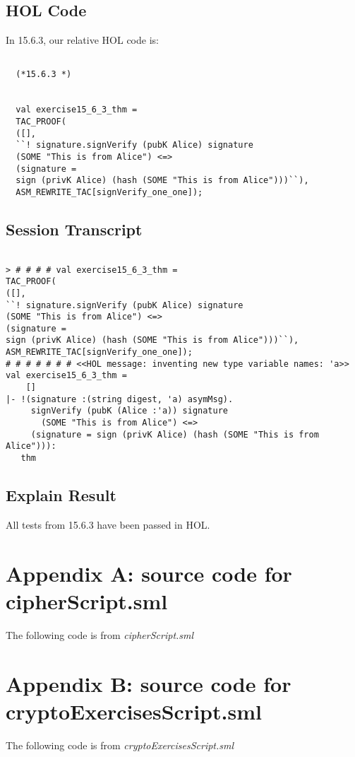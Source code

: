 \documentclass{report}
\begin{document}
\section{HOL Code}
\label{HOl Code 1563}
In 15.6.3, our relative HOL code is:
\begin{lstlisting}[frame=trBL]

  (*15.6.3 *)


  val exercise15_6_3_thm =
  TAC_PROOF(
  ([],
  ``! signature.signVerify (pubK Alice) signature
  (SOME "This is from Alice") <=>
  (signature =
  sign (privK Alice) (hash (SOME "This is from Alice")))``),
  ASM_REWRITE_TAC[signVerify_one_one]);
\end{lstlisting}

\section{Session Transcript}
\label{Session Trans 1563}
\setcounter{sessioncount}{0}
\begin{session}


  \begin{scriptsize}
\begin{verbatim}

> # # # # val exercise15_6_3_thm =
TAC_PROOF(
([],
``! signature.signVerify (pubK Alice) signature
(SOME "This is from Alice") <=>
(signature =
sign (privK Alice) (hash (SOME "This is from Alice")))``),
ASM_REWRITE_TAC[signVerify_one_one]);
# # # # # # # <<HOL message: inventing new type variable names: 'a>>
val exercise15_6_3_thm =
    []
|- !(signature :(string digest, 'a) asymMsg).
     signVerify (pubK (Alice :'a)) signature
       (SOME "This is from Alice") <=>
     (signature = sign (privK Alice) (hash (SOME "This is from Alice"))):
   thm
\end{verbatim}
  \end{scriptsize}
\end{session}
\section{Explain Result}
\label{explain result 1563}
All tests from 15.6.3 have been passed in HOL.


\chapter{Appendix A: source code for cipherScript.sml}
\label{cha:appendix-a:-cipherScript.sml.}
The following code is from \emph{cipherScript.sml}


\chapter{Appendix B: source code for cryptoExercisesScript.sml}
\label{cha:appendix-a:-cryptoExercisesScript.sml}
The following code is from \emph{cryptoExercisesScript.sml}

\end{document}
